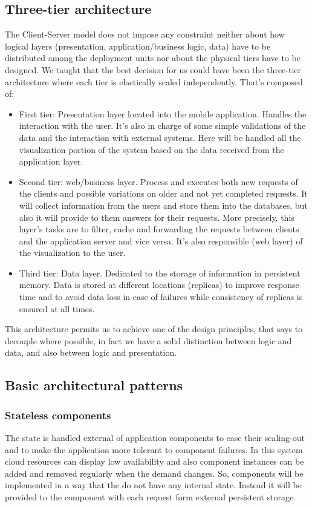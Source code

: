 \subsection{Three-tier architecture}
The Client-Server model does not impose any constraint neither about how logical layers (presentation, application/business logic, data) have to be distributed among the deployment units nor about the physical tiers have to be designed.
We taught that the best decision for us could have been the three-tier architecture where each tier is elastically scaled independently. 
That’s composed of:
\begin{itemize}
\item	First tier: Presentation layer located into the mobile application. Handles the interaction with the user. It’s also in charge of some simple validations of the data and the interaction with external systems. Here will be handled all the visualization portion of the system based on the data received from the application layer.
\item	Second tier: web/business layer. Process and executes both new requests of the clients and possible variations on older and not yet completed requests. It will collect information from the users and store them into the databases, but also it will provide to them answers for their requests. 
More precisely, this layer’s tasks are to filter, cache and forwarding the requests between clients and the application server and vice versa. 
It’s also responsible (web layer) of the visualization to the user.
\item	Third tier: Data layer. Dedicated to the storage of information in persistent memory. Data is stored at different locations (replicas) to improve response time and to avoid data loss in case of failures while consistency of replicas is ensured at all times.
\end{itemize}
This architecture permits us to achieve one of the design principles, that says to decouple where possible, in fact we have a solid distinction between logic and data, and also between logic and presentation.

\subsection{Basic architectural patterns}

\subsubsection{Stateless components}
The state is handled external of application components to ease their scaling-out and to make the application more tolerant to component failures. 
In this system cloud resources can display low availability and also component instances can be added and removed regularly when the demand changes.
So, components will be implemented in a way that the do not have any internal state. Instead it will be provided to the component with each request form external persistent storage.

